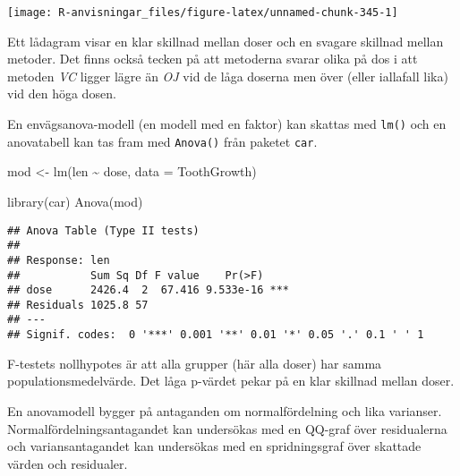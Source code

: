 \documentclass[
]{book}
\newenvironment{Shaded}{\begin{snugshade}}{\end{snugshade}}
\newcommand{\AttributeTok}[1]{\textcolor[rgb]{0.77,0.63,0.00}{#1}}
\newcommand{\FunctionTok}[1]{\textcolor[rgb]{0.00,0.00,0.00}{#1}}
\newcommand{\NormalTok}[1]{#1}
\newcommand{\OtherTok}[1]{\textcolor[rgb]{0.56,0.35,0.01}{#1}}
\newcommand{\SpecialCharTok}[1]{\textcolor[rgb]{0.00,0.00,0.00}{#1}}
\theoremstyle{definition}
\theoremstyle{definition}
\theoremstyle{definition}
\theoremstyle{definition}
\theoremstyle{remark}
\begin{document}
\begin{center}\texttt{[image: R-anvisningar\_files/figure-latex/unnamed-chunk-345-1]} \end{center}

Ett lådagram visar en klar skillnad mellan doser och en svagare skillnad mellan metoder. Det finns också tecken på att metoderna svarar olika på dos i att metoden \emph{VC} ligger lägre än \emph{OJ} vid de låga doserna men över (eller iallafall lika) vid den höga dosen.

En envägsanova-modell (en modell med en faktor) kan skattas med \texttt{lm()} och en anovatabell kan tas fram med \texttt{Anova()} från paketet \texttt{car}.

\begin{Shaded}
\begin{Highlighting}[]
\NormalTok{mod }\OtherTok{\textless{}{-}} \FunctionTok{lm}\NormalTok{(len }\SpecialCharTok{\textasciitilde{}}\NormalTok{ dose, }\AttributeTok{data =}\NormalTok{ ToothGrowth)}

\FunctionTok{library}\NormalTok{(car)}
\FunctionTok{Anova}\NormalTok{(mod)}
\end{Highlighting}
\end{Shaded}

\begin{verbatim}
## Anova Table (Type II tests)
## 
## Response: len
##           Sum Sq Df F value    Pr(>F)    
## dose      2426.4  2  67.416 9.533e-16 ***
## Residuals 1025.8 57                      
## ---
## Signif. codes:  0 '***' 0.001 '**' 0.01 '*' 0.05 '.' 0.1 ' ' 1
\end{verbatim}

F-testets nollhypotes är att alla grupper (här alla doser) har samma populationsmedelvärde. Det låga p-värdet pekar på en klar skillnad mellan doser.

En anovamodell bygger på antaganden om normalfördelning och lika varianser. Normalfördelningsantagandet kan undersökas med en QQ-graf över residualerna och variansantagandet kan undersökas med en spridningsgraf över skattade värden och residualer.
\end{document}

